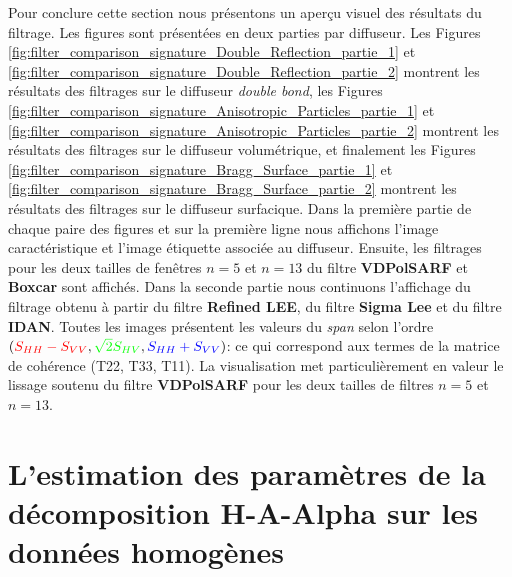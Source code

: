 Pour conclure cette section nous présentons un aperçu visuel des résultats du filtrage. Les figures sont présentées en deux parties par diffuseur. Les Figures \ref{fig:filter_comparison_signature_Double_Reflection_partie_1} et \ref{fig:filter_comparison_signature_Double_Reflection_partie_2} montrent les résultats des filtrages sur le diffuseur \textit{double bond}, les Figures \ref{fig:filter_comparison_signature_Anisotropic_Particles_partie_1} et  \ref{fig:filter_comparison_signature_Anisotropic_Particles_partie_2} montrent les résultats des filtrages sur le diffuseur volumétrique, et finalement les Figures \ref{fig:filter_comparison_signature_Bragg_Surface_partie_1} et \ref{fig:filter_comparison_signature_Bragg_Surface_partie_2} montrent les résultats des filtrages sur le diffuseur surfacique.  Dans la première partie de chaque paire des figures et sur la première ligne nous affichons l'image caractéristique et l'image étiquette associée au diffuseur.  Ensuite, les filtrages pour les deux tailles de fenêtres $n=5$ et $n=13$ du filtre \textbf{VDPolSARF} et \textbf{Boxcar} sont affichés.  Dans la seconde partie nous continuons l'affichage du filtrage obtenu à partir du filtre \textbf{Refined LEE}, du filtre \textbf{Sigma Lee} et du filtre \textbf{IDAN}. Toutes les images présentent les valeurs du \textit{span} selon l'ordre  $(\textcolor{red}{S_{HH}-S_{VV}}, \textcolor{green}{\sqrt{2}S_{HV}}, \textcolor{blue}{S_{HH}+S_{VV}})$: ce qui correspond aux termes de la matrice de cohérence (T22, T33, T11).  La visualisation met particulièrement en valeur le lissage soutenu du filtre \textbf{VDPolSARF} pour les deux tailles de filtres  $n=5$ et $n=13$.






\section{L'estimation des paramètres de la décomposition H-A-Alpha sur les données homogènes}


